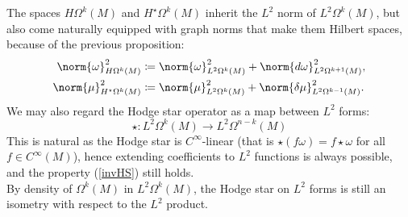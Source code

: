 \documentclass{ifacconf}
\newcommand{\drh}[2]{\Omega^{#2}(#1)}
\begin{document}
The spaces $H\drh{M}{k}$ and $H^{\star}\drh{M}{k}$ inherit the $L^2$ norm of $L^2\drh{M}{k}$, but also come naturally equipped with graph norms that make them Hilbert spaces, because of the previous proposition:
\begin{align*}
    \norm{\omega}_{H\drh{M}{k}}^2&\coloneqq \norm{\omega}_{L^2\drh{M}{k}}^2+\norm{d\omega}_{L^2\drh{M}{k+1}}^2,\\
    \norm{\mu}_{H^{\star}\drh{M}{k}}^2&\coloneqq \norm{\mu}_{L^2\drh{M}{k}}^2+\norm{\delta\mu}_{L^2\drh{M}{k-1}}^2.
\end{align*}
We may also regard the Hodge star operator as a map between $L^2$ forms:
\[
    \star\colon L^2\drh{M}{k}\rightarrow L^2\drh{M}{n-k}
\]
This is natural as the Hodge star is $C^{\infty}$-linear (that is $\star(f\omega)=f\star\omega$  for all $f\in C^{\infty}(M)$), hence extending coefficients to $L^2$ functions is always possible, and the property (\ref{invHS}) still holds.\\
By density of $\drh{M}{k}$ in $L^2\drh{M}{k}$, the Hodge star on $L^2$ forms is still an isometry with respect to the $L^2$ product.
\end{document}
